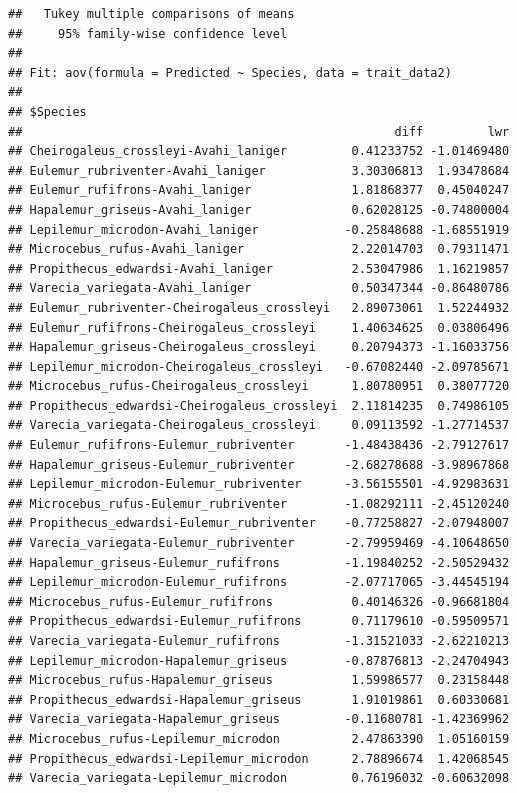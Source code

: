 \documentclass[
  12pt,
]{article}
\begin{document}
\begin{verbatim}
##   Tukey multiple comparisons of means
##     95% family-wise confidence level
## 
## Fit: aov(formula = Predicted ~ Species, data = trait_data2)
## 
## $Species
##                                                    diff         lwr
## Cheirogaleus_crossleyi-Avahi_laniger         0.41233752 -1.01469480
## Eulemur_rubriventer-Avahi_laniger            3.30306813  1.93478684
## Eulemur_rufifrons-Avahi_laniger              1.81868377  0.45040247
## Hapalemur_griseus-Avahi_laniger              0.62028125 -0.74800004
## Lepilemur_microdon-Avahi_laniger            -0.25848688 -1.68551919
## Microcebus_rufus-Avahi_laniger               2.22014703  0.79311471
## Propithecus_edwardsi-Avahi_laniger           2.53047986  1.16219857
## Varecia_variegata-Avahi_laniger              0.50347344 -0.86480786
## Eulemur_rubriventer-Cheirogaleus_crossleyi   2.89073061  1.52244932
## Eulemur_rufifrons-Cheirogaleus_crossleyi     1.40634625  0.03806496
## Hapalemur_griseus-Cheirogaleus_crossleyi     0.20794373 -1.16033756
## Lepilemur_microdon-Cheirogaleus_crossleyi   -0.67082440 -2.09785671
## Microcebus_rufus-Cheirogaleus_crossleyi      1.80780951  0.38077720
## Propithecus_edwardsi-Cheirogaleus_crossleyi  2.11814235  0.74986105
## Varecia_variegata-Cheirogaleus_crossleyi     0.09113592 -1.27714537
## Eulemur_rufifrons-Eulemur_rubriventer       -1.48438436 -2.79127617
## Hapalemur_griseus-Eulemur_rubriventer       -2.68278688 -3.98967868
## Lepilemur_microdon-Eulemur_rubriventer      -3.56155501 -4.92983631
## Microcebus_rufus-Eulemur_rubriventer        -1.08292111 -2.45120240
## Propithecus_edwardsi-Eulemur_rubriventer    -0.77258827 -2.07948007
## Varecia_variegata-Eulemur_rubriventer       -2.79959469 -4.10648650
## Hapalemur_griseus-Eulemur_rufifrons         -1.19840252 -2.50529432
## Lepilemur_microdon-Eulemur_rufifrons        -2.07717065 -3.44545194
## Microcebus_rufus-Eulemur_rufifrons           0.40146326 -0.96681804
## Propithecus_edwardsi-Eulemur_rufifrons       0.71179610 -0.59509571
## Varecia_variegata-Eulemur_rufifrons         -1.31521033 -2.62210213
## Lepilemur_microdon-Hapalemur_griseus        -0.87876813 -2.24704943
## Microcebus_rufus-Hapalemur_griseus           1.59986577  0.23158448
## Propithecus_edwardsi-Hapalemur_griseus       1.91019861  0.60330681
## Varecia_variegata-Hapalemur_griseus         -0.11680781 -1.42369962
## Microcebus_rufus-Lepilemur_microdon          2.47863390  1.05160159
## Propithecus_edwardsi-Lepilemur_microdon      2.78896674  1.42068545
## Varecia_variegata-Lepilemur_microdon         0.76196032 -0.60632098

\end{verbatim}
\end{document}

